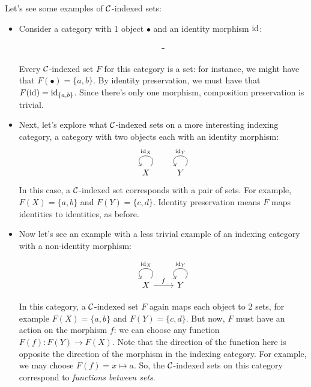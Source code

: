 Let's see some examples of $\mathcal C$-indexed sets:
\begin{itemize}
  \item Consider a category with 1 object $\bullet$ and 
  an identity morphism $\operatorname{id}$: 
  
  \begin{equation}
  \usebox0
  \label{cat:1-obj}
  \end{equation}

  Every $\mathcal C$-indexed set $F$ for this category is a set: 
  for instance, we might have that 
  $F(\bullet) = \{a, b\}$. By identity preservation, we must 
  have that $F(\operatorname{id}) = \operatorname{id}_{\{a, b\}}$. Since there's only 
  one morphism, composition preservation is trivial.
  \item Next, let's explore what $\mathcal C$-indexed sets on a more interesting 
  indexing category, a category with two objects each with an identity morphism:
  \begin{equation}
\begin{tikzcd}
X \arrow["\id_X"', loop, distance=2em, in=125, out=55] 
& Y \arrow["\id_Y"', loop, distance=2em, in=125, out=55]
\end{tikzcd}
  \end{equation}
  In this case, a $\mathcal C$-indexed set corresponds with a 
  pair of sets. For example, $F(X) = \{a, b\}$ and 
  $F(Y) = \{c, d\}$. Identity preservation means $F$ maps identities to 
  identities, as before.
  \item Now let's see an example with a less trivial example of 
  an indexing category with a non-identity morphism:

  \begin{equation}
    \begin{tikzcd}
X \arrow["\id_X"', loop, distance=2em, in=125, out=55]  \arrow[r, "f"]
& Y \arrow["\id_Y"', loop, distance=2em, in=125, out=55]
\end{tikzcd}
\label{cat:2obj}
  \end{equation}

  In this category, a $\mathcal C$-indexed set $F$ again maps each 
  object to 2 sets, for example $F(X) = \{a, b\}$ and $F(Y) = \{c, d\}$.
  But now, $F$ must have an action on the morphism $f$: 
  we can choose any function $F(f) : F(Y) \to F(X)$. Note that the 
  direction of the function here is opposite the direction of the morphism 
  in the indexing category.
  For example, we may choose $F(f) = x \mapsto a$.
  So, the $\mathcal C$-indexed sets on this category correspond to \emph{functions
  between sets}.



\end{itemize}
